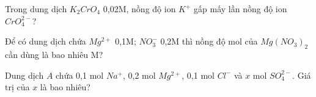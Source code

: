 \begin{bt}
    Trong dung dịch $K_2CrO_4$ 0,02M, nồng độ ion $K^+$ gấp mấy lần nồng độ ion $CrO_4^{2-}$?
\end{bt}
\begin{bt}
    Để có dung dịch chứa $Mg^{2+}$ 0,1M; $NO_3^-$ 0,2M thì nồng độ mol của $Mg(NO_3)_2$ cần dùng là bao nhiêu M?
\end{bt}
\begin{bt}
    Dung dịch $A$ chứa 0,1 mol $Na^+$, 0,2 mol $Mg^{2+}$, 0,1 mol $Cl^-$ và $x$ mol $SO_4^{2-}$. Giá trị của $x$ là bao nhiêu?
\end{bt}

